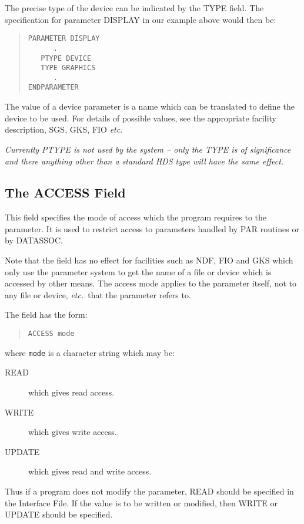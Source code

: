 \documentclass[twoside,11pt]{article}
\newcommand{\xlabel}[1]{}
\renewcommand{\_}{\texttt{\symbol{95}}}
\begin{document}
The precise type of the device can be indicated by the TYPE field.
The specification for parameter DISPLAY in our example above would then be:
\begin{quote} \begin{verbatim}
PARAMETER DISPLAY
      .
   PTYPE DEVICE
   TYPE GRAPHICS
      .
ENDPARAMETER
\end{verbatim} \end{quote}
The value of a device parameter is
a name which can be translated to define the device to be used.
For details of possible values, see the appropriate facility description,
SGS, GKS, FIO {\em etc}.

{\em
Currently PTYPE is not used by the system -- only the TYPE is of significance
and there anything other than a standard HDS type will have the same effect.}

\subsection{The ACCESS Field\xlabel{the_access_field}}

This field specifies the mode of access which the program
requires to the parameter.
It is used to restrict access to parameters handled by PAR routines or by
DAT\_ASSOC.

Note that the field has no effect for facilities such as NDF, FIO and GKS
which only use the parameter system to get the name of a file or device which
is accessed by other means. The access mode applies to the parameter itself,
not to any file or device, {\em etc.}\ that the parameter refers to.

The field has the form:
\begin{quote} \begin{verbatim}
ACCESS mode
\end{verbatim} \end{quote}
where \texttt{mode} is a character string which may be:
\begin{description}
\item[READ] which gives read access.
\item[WRITE] which gives write access.
\item[UPDATE] which gives read and write access.
\end{description}

Thus if a program does not modify the parameter,
READ should be specified in the Interface File.
If the value is to be written or modified, then WRITE or UPDATE
should be specified.
\end{document}
